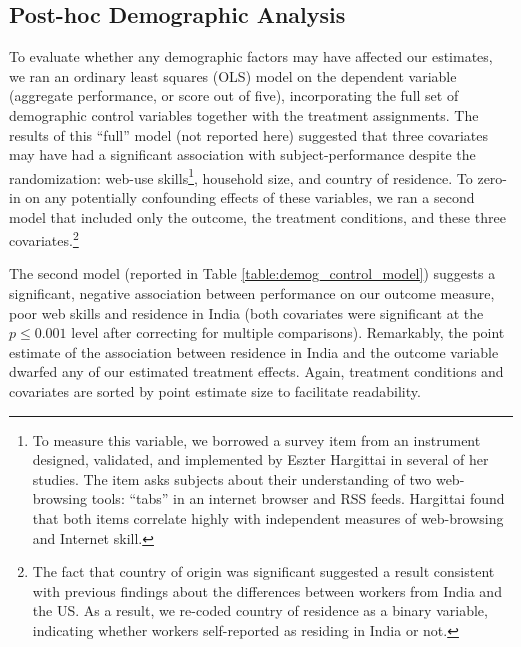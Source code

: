 \documentclass{cscw2010}
\begin{document}
\subsection{Post-hoc Demographic Analysis}
To evaluate whether any demographic factors may have
affected our estimates, we ran an ordinary least squares (OLS) model
on the dependent variable (aggregate performance, or score out of five), incorporating
the full set of demographic control variables together with the
treatment assignments. The results of this ``full'' model (not
reported here) suggested that three covariates may have had a
significant association with subject-performance despite the
randomization: web-use skills\footnote{To measure this variable, we
  borrowed a survey item from an instrument designed, validated, and
  implemented by Eszter Hargittai in several of her
  studies.\cite{hargittai2009update} The item asks subjects about
  their understanding of two web-browsing tools: ``tabs'' in an
  internet browser and RSS feeds. Hargittai found that both items
  correlate highly with independent measures of web-browsing and
  Internet skill.}, household size, and country of residence. To
zero-in on any potentially confounding effects of these variables, we
ran a second model that included only the outcome, the treatment
conditions, and these three covariates.\footnote{The fact that country
  of origin was significant suggested a result consistent with
  previous findings about the differences between workers from India
  and the US\cite{ipeirotis2010}. As a result, we re-coded country
  of residence as a binary variable, indicating whether workers
  self-reported as residing in India or not.}

The second model (reported in Table \ref{table:demog_control_model})
suggests a significant, negative association between performance on
our outcome measure, poor web skills and residence in India (both
covariates were significant at the $p \leq 0.001$ level after
correcting for multiple comparisons). Remarkably, the point estimate
of the association between residence in India and the outcome variable
dwarfed any of our estimated treatment effects. Again, treatment
conditions and covariates are sorted by point estimate size to
facilitate readability.
\end{document}
